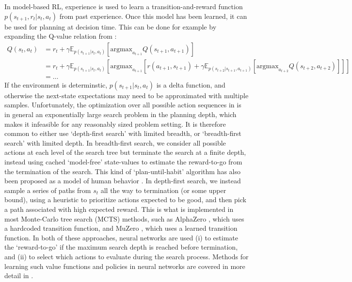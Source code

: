In model-based RL, experience is used to learn a transition-and-reward function $p(s_{t+1}, r_t | s_t, a_t)$ from past experience.
Once this model has been learned, it can be used for planning at decision time.
This can be done for example by expanding the Q-value relation from :
{\small
\begin{align}
    \label{eq:Q-search}
    Q(s_t,a_t) &=  r_t + \gamma \mathbb{E}_{p(s_{t+1} | s_t, a_t)} \left [ \text{argmax}_{a_{t+1}} Q(s_{t+1}, a_{t+1}) \right ]\\
    &= r_t + \gamma \mathbb{E}_{p(s_{t+1} | s_t, a_t)} \left [ \text{argmax}_{a_{t+1}}
    \left [ r(a_{t+1}, s_{t+1}) + \gamma \mathbb{E}_{p(s_{t+2} | s_{t+1}, a_{t+1})} \left [ \text{argmax}_{a_{t+2}} Q(s_{t+2}, a_{t+2}) \right ] \right ] \right ] \\
    &= \ldots
\end{align}
}
If the environment is determinstic, $p(s_{t+1} | s_t, a_t)$ is a delta function, and otherwise the next-state expectations may need to be approximated with multiple samples.
Unfortunately, the optimization over all possible action sequences in  is in general an exponentially large search problem in the planning depth, which makes it infeasible for any reasonably sized problem setting.
It is therefore common to either use `depth-first search' with limited breadth, or `breadth-first search' with limited depth.
In breadth-first search, we consider all possible actions at each level of the search tree but terminate the search at a finite depth, instead using cached `model-free' state-values to estimate the reward-to-go from the termination of the search.
This kind of `plan-until-habit' algorithm has also been proposed as a model of human behavior \citep{keramati2016adaptive}.
In depth-first search, we instead sample a series of paths from $s_t$ all the way to termination (or some upper bound), using a heuristic to prioritize actions expected to be good, and then pick a path associated with high expected reward.
This is what is implemented in most Monte-Carlo tree search (MCTS) methods, such as AlphaZero \citep{silver2018general}, which uses a hardcoded transition function, and MuZero \citep{schrittwieser2020mastering}, which uses a learned transition function.
In both of these approaches, neural networks are used (i) to estimate the `reward-to-go' if the maximum search depth is reached before termination, and (ii) to select which actions to evaluate during the search process.
Methods for learning such value functions and policies in neural networks are covered in more detail in .


